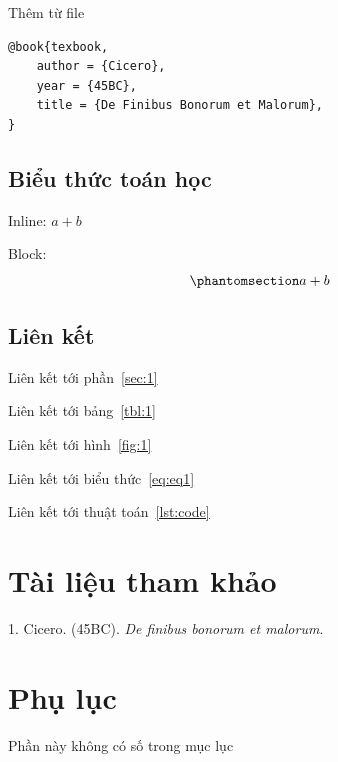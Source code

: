 \documentclass[14pt,oneside]{scrbook}
\newlength{\cslhangindent}
\newenvironment{CSLReferences}[2] %
{\begin{list}{}{%
\setlength{\itemindent}{\smallskipamount}
\setlength{\leftmargin}{0pt}
\setlength{\parsep}{\smallskipamount}
\ifodd #1
\setlength{\leftmargin}{\cslhangindent}
\setlength{\itemindent}{-1\cslhangindent}
\fi
\setlength{\itemsep}{#2\baselineskip}}}
{\end{list}}
\begin{document}
Thêm từ file

\begin{verbatim}
@book{texbook,
    author = {Cicero},
    year = {45BC},
    title = {De Finibus Bonorum et Malorum},
}
\end{verbatim}

\section{Biểu thức toán học}\label{biux1ec3u-thux1ee9c-touxe1n-hux1ecdc}

Inline: \(a+b\)

Block: \begin{equation}\phantomsection\label{eq:eq1}{a+b}\end{equation}

\section{Liên kết}\label{liuxean-kux1ebft}

Liên kết tới phần~\ref{sec:1}

Liên kết tới bảng~\ref{tbl:1}

Liên kết tới hình~\ref{fig:1}

Liên kết tới biểu thức~\ref{eq:eq1}

Liên kết tới thuật toán~\ref{lst:code}

\chapter{Tài liệu tham khảo}\label{tuxe0i-liux1ec7u-tham-khux1ea3o}

\label{refs}
\begin{CSLReferences}{1}{0}
1. Cicero. (45BC). \emph{De finibus bonorum et malorum}.

\end{CSLReferences}

\chapter*{Phụ lục}\label{phux1ee5-lux1ee5c}


Phần này không có số trong mục lục
\backmatter
\end{document}
